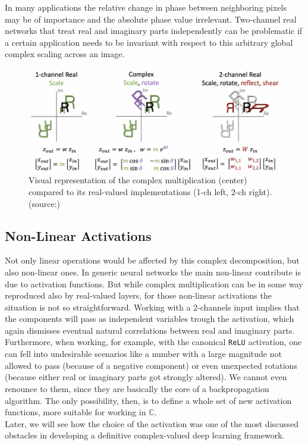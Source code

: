 \documentclass[../main.tex]{subfiles}
\begin{document}
In many applications the relative change in phase between neighboring pixels may be of importance and the absolute phase value irrelevant. Two-channel real networks that treat real and imaginary parts independently can be problematic if a certain application needs to be invariant with respect to this arbitrary global complex scaling across an image. 

\begin{figure}[!ht]
	\centering
	\includegraphics[width=\textwidth]{pictures/multiplication_dof.pdf}
	\caption{Visual representation of the complex multiplication (center) compared to its real-valued implementations (1-ch left, 2-ch right). (source:\cite{Virtue:EECS-2019-126})}
	\label{fig:mult_dof}
\end{figure}


\subsection*{Non-Linear Activations}
Not only linear operations would be affected by this complex decomposition, but also non-linear ones. In generic neural networks the main non-linear contribute is due to activation functions. But while complex multiplication can be in some way reproduced also by real-valued layers, for those non-linear activations the situation is not so straightforward. Working with a 2-channels input implies that the components will pass as independent variables trough the activation, which again dismisses eventual natural correlations between real and imaginary parts. Furthermore, when working, for example, with the canonical \texttt{ReLU} activation, one can fell into undesirable scenarios like a number with a large magnitude not allowed to pass (because of a negative component) or even unexpected rotations (because either real or imaginary parts got strongly altered). We cannot even renounce to them, since they are basically the core of a backpropagation algorithm. The only possibility, then, is to define a whole set of new activation functions, more suitable for working in $\mathds{C}$.\\
Later, we will see how the choice of the activation was one of the most discussed obstacles in developing a definitive complex-valued deep learning framework.
\end{document}

